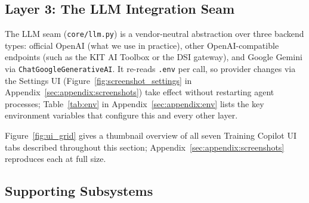 \subsection{Layer 3: The LLM Integration Seam}\label{sec:architecture:llm}

The LLM seam (\texttt{core/llm.py}) is a vendor-neutral abstraction over three backend types: official OpenAI (what we use in practice), other OpenAI-compatible endpoints (such as the KIT AI Toolbox or the DSI gateway), and Google Gemini via \texttt{ChatGoogleGenerativeAI}. It re-reads \texttt{.env} per call, so provider changes via the Settings UI (Figure~\ref{fig:screenshot_settings} in Appendix~\ref{sec:appendix:screenshots}) take effect without restarting agent processes; Table~\ref{tab:env} in Appendix~\ref{sec:appendix:env} lists the key environment variables that configure this and every other layer.

Figure~\ref{fig:ui_grid} gives a thumbnail overview of all seven Training Copilot UI tabs described throughout this section; Appendix~\ref{sec:appendix:screenshots} reproduces each at full size.



\subsection{Supporting Subsystems}\label{sec:architecture:supporting}

